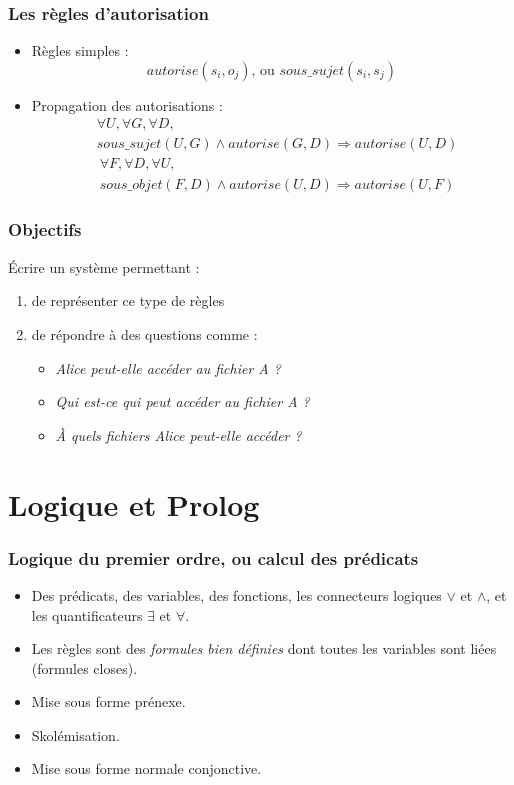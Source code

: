 \documentclass[aspectratio=43]{beamer}
\begin{document}
\begin{frame}
\frametitle{Les règles d'autorisation}
\begin{itemize}
  \item Règles simples :
      $$autorise(s_{i}, o_{j})\textrm{, ou }sous\_sujet(s_{i}, s_{j})$$
  \item Propagation des autorisations :
    \begin{align*}
      &\forall U, \forall G, \forall D, \\
      &sous\_sujet(U, G) \wedge autorise(G, D) \Rightarrow autorise(U, D)
      \end{align*}
    \begin{align*}
      &\forall F, \forall D, \forall U, \\
      &sous\_objet(F, D) \wedge autorise(U, D) \Rightarrow autorise(U, F)
      \end{align*}
\end{itemize}

\end{frame}

\begin{frame}
\frametitle{Objectifs}

Écrire un système permettant :
\begin{enumerate}
  \item de représenter ce type de règles
  \item de répondre à des questions comme :
    \begin{itemize}
      \item \it{Alice peut-elle accéder au fichier A ?}
      \item \it{Qui est-ce qui peut accéder au fichier A ?}
      \item \it{À quels fichiers Alice peut-elle accéder ?}
    \end{itemize}
\end{enumerate}
\end{frame}


\section{Logique et Prolog}

\begin{frame}
\frametitle{Logique du premier ordre, ou calcul des prédicats}

\begin{itemize}
\item Des prédicats, des variables, des fonctions, les connecteurs logiques $\vee$ et $\wedge$, et les quantificateurs $\exists$ et $\forall$.

\item Les règles sont des \textit{formules bien définies} dont toutes les variables sont liées (formules closes).

\item Mise sous forme prénexe.

\item Skolémisation.

\item Mise sous forme normale conjonctive.
\end{itemize}
\end{frame}
\end{document}
